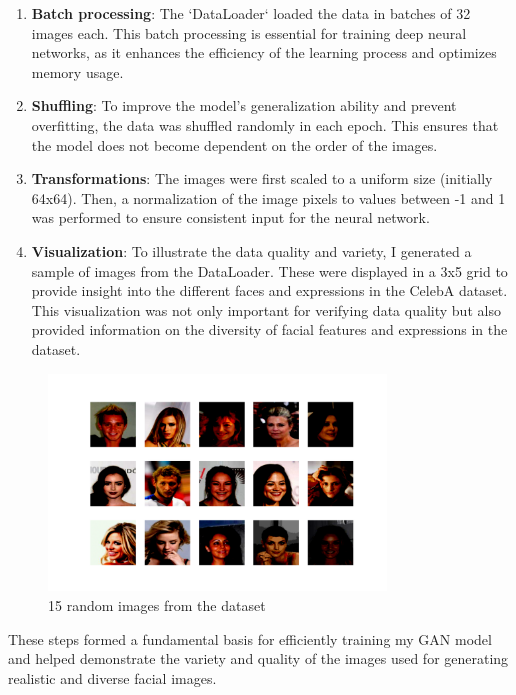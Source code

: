 \documentclass[a4paper, 12pt]{article}
\begin{document}
\begin{enumerate}
 \item \textbf{Batch processing}: The `DataLoader` loaded the data in batches of 32 images each. This batch processing is essential for training deep neural networks, as it enhances the efficiency of the learning process and optimizes memory usage.

 \item \textbf{Shuffling}: To improve the model's generalization ability and prevent overfitting, the data was shuffled randomly in each epoch. This ensures that the model does not become dependent on the order of the images.

 \item \textbf{Transformations}: The images were first scaled to a uniform size (initially 64x64). Then, a normalization of the image pixels to values between -1 and 1 was performed to ensure consistent input for the neural network.

 \item \textbf{Visualization}: To illustrate the data quality and variety, I generated a sample of images from the DataLoader. These were displayed in a 3x5 grid to provide insight into the different faces and expressions in the CelebA dataset. This visualization was not only important for verifying data quality but also provided information on the diversity of facial features and expressions in the dataset.
\end{enumerate}

\begin{figure}[ht]
\centering
\includegraphics[width=0.8\textwidth]{./img/data_faces.png}
\caption{15 random images from the dataset}
\label{fig:random_faces}
\end{figure}

These steps formed a fundamental basis for efficiently training my GAN model and helped demonstrate the variety and quality of the images used for generating realistic and diverse facial images.
\end{document}
